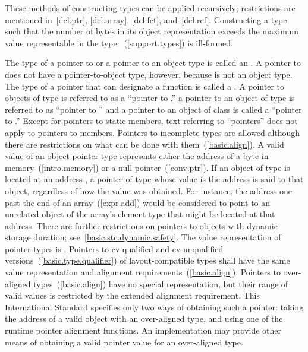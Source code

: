 \pnum
These methods of constructing types can be applied recursively;
restrictions are mentioned in~\ref{dcl.ptr}, \ref{dcl.array},
\ref{dcl.fct}, and~\ref{dcl.ref}. Constructing a type such that the number of
bytes in its object representation exceeds the maximum value representable in
the type ~(\ref{support.types}) is ill-formed.

\pnum
{}%
The type of a pointer to  or a pointer to an object type is
called an . \enternote A pointer to 
does not have a pointer-to-object type, however, because  is not
an object type. \exitnote The type of a pointer that can designate a function
is called a .
A pointer to objects of type  is referred to as a ``pointer to
.'' \enterexample a pointer to an object of type  is
referred to as ``pointer to  '' and a pointer to an object of
class  is called a ``pointer to .'' \exitexample
Except for pointers to static members, text referring to ``pointers''
does not apply to pointers to members. Pointers to incomplete types are
allowed although there are restrictions on what can be done with
them~(\ref{basic.align}).
%
A valid value of an object
pointer type represents either the address of a byte in
memory~(\ref{intro.memory}) or a null pointer~(\ref{conv.ptr}). If an
object of type  is located at an address , a pointer
of type   whose value is the address  is
said to  that object, regardless of how the value was
obtained. \enternote For instance, the address one past the end of an
array~(\ref{expr.add}) would be considered to point to an unrelated
object of the array's element type that might be located at that
address. There are further restrictions on pointers to objects with dynamic storage
duration; see~\ref{basic.stc.dynamic.safety}. \exitnote The value representation of
pointer types is . Pointers to
cv-qualified and cv-unqualified
versions~(\ref{basic.type.qualifier}) of layout-compatible types shall
have the same value representation and alignment
requirements~(\ref{basic.align}).
\enternote Pointers to over-aligned types~(\ref{basic.align}) have no special
representation, but their range of valid values is restricted by the extended
alignment requirement. This International Standard specifies only two ways
of obtaining such a pointer: taking the address of a valid object with
an over-aligned type, and using one of the runtime pointer alignment functions.
An implementation may provide other means of obtaining a valid pointer value
for an over-aligned type.\exitnote

